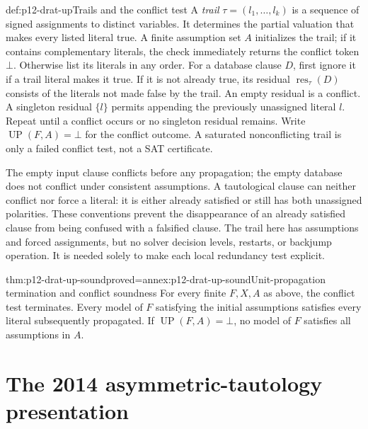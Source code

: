 \begin{hbdefinition}{def:p12-drat-up}{Trails and the conflict test}
A \emph{trail} \(\tau=(l_1,\ldots,l_k)\) is a sequence of signed
assignments to distinct variables.  It determines the partial valuation that
makes every listed literal true.  A finite assumption set \(A\) initializes
the trail; if it contains complementary literals, the check immediately
returns the conflict token \(\bot\).  Otherwise list its literals in any
order.  For a database clause \(D\), first ignore it if a trail literal makes
it true.  If it is not already true, its residual
\(\operatorname{res}_{\tau}(D)\) consists of the literals not made false
by the trail.  An empty residual is a conflict.  A singleton residual
\(\{l\}\) permits appending the previously unassigned literal \(l\).
Repeat until a conflict occurs or no singleton residual remains.  Write
\(\operatorname{UP}(F,A)=\bot\) for the conflict outcome.  A saturated
nonconflicting trail is only a failed conflict test, not a SAT certificate.

The empty input clause conflicts before any propagation; the empty database
does not conflict under consistent assumptions.  A tautological clause can
neither conflict nor force a literal: it is either already satisfied or still
has both unassigned polarities.  These conventions prevent the disappearance
of an already satisfied clause from being confused with a falsified clause.
The trail here has assumptions and forced assignments, but no solver decision
levels, restarts, or backjump operation.  It is needed solely to make each
local redundancy test explicit.
\end{hbdefinition}

\begin{hblemma}{thm:p12-drat-up-sound}{proved=annex:p12-drat-up-sound}{Unit-propagation termination and conflict soundness}
For every finite \(F,X,A\) as above, the conflict test terminates.  Every
model of \(F\) satisfying the initial assumptions satisfies every literal
subsequently propagated.  If \(\operatorname{UP}(F,A)=\bot\), no model
of \(F\) satisfies all assumptions in \(A\).
\end{hblemma}

\section{The 2014 asymmetric-tautology presentation}

